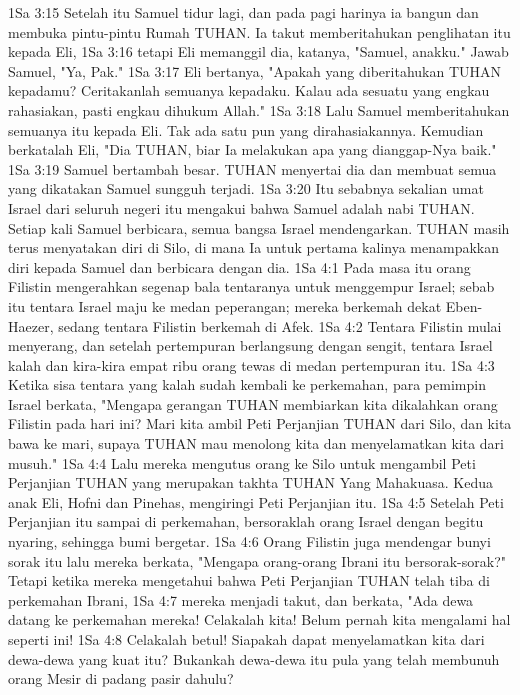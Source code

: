 1Sa 3:15  Setelah itu Samuel tidur lagi, dan pada pagi harinya ia bangun dan membuka pintu-pintu Rumah TUHAN. Ia takut memberitahukan penglihatan itu kepada Eli,
1Sa 3:16  tetapi Eli memanggil dia, katanya, "Samuel, anakku." Jawab Samuel, "Ya, Pak."
1Sa 3:17  Eli bertanya, "Apakah yang diberitahukan TUHAN kepadamu? Ceritakanlah semuanya kepadaku. Kalau ada sesuatu yang engkau rahasiakan, pasti engkau dihukum Allah."
1Sa 3:18  Lalu Samuel memberitahukan semuanya itu kepada Eli. Tak ada satu pun yang dirahasiakannya. Kemudian berkatalah Eli, "Dia TUHAN, biar Ia melakukan apa yang dianggap-Nya baik."
1Sa 3:19  Samuel bertambah besar. TUHAN menyertai dia dan membuat semua yang dikatakan Samuel sungguh terjadi.
1Sa 3:20  Itu sebabnya sekalian umat Israel dari seluruh negeri itu mengakui bahwa Samuel adalah nabi TUHAN. Setiap kali Samuel berbicara, semua bangsa Israel mendengarkan. TUHAN masih terus menyatakan diri di Silo, di mana Ia untuk pertama kalinya menampakkan diri kepada Samuel dan berbicara dengan dia.
1Sa 4:1  Pada masa itu orang Filistin mengerahkan segenap bala tentaranya untuk menggempur Israel; sebab itu tentara Israel maju ke medan peperangan; mereka berkemah dekat Eben-Haezer, sedang tentara Filistin berkemah di Afek.
1Sa 4:2  Tentara Filistin mulai menyerang, dan setelah pertempuran berlangsung dengan sengit, tentara Israel kalah dan kira-kira empat ribu orang tewas di medan pertempuran itu.
1Sa 4:3  Ketika sisa tentara yang kalah sudah kembali ke perkemahan, para pemimpin Israel berkata, "Mengapa gerangan TUHAN membiarkan kita dikalahkan orang Filistin pada hari ini? Mari kita ambil Peti Perjanjian TUHAN dari Silo, dan kita bawa ke mari, supaya TUHAN mau menolong kita dan menyelamatkan kita dari musuh."
1Sa 4:4  Lalu mereka mengutus orang ke Silo untuk mengambil Peti Perjanjian TUHAN yang merupakan takhta TUHAN Yang Mahakuasa. Kedua anak Eli, Hofni dan Pinehas, mengiringi Peti Perjanjian itu.
1Sa 4:5  Setelah Peti Perjanjian itu sampai di perkemahan, bersoraklah orang Israel dengan begitu nyaring, sehingga bumi bergetar.
1Sa 4:6  Orang Filistin juga mendengar bunyi sorak itu lalu mereka berkata, "Mengapa orang-orang Ibrani itu bersorak-sorak?" Tetapi ketika mereka mengetahui bahwa Peti Perjanjian TUHAN telah tiba di perkemahan Ibrani,
1Sa 4:7  mereka menjadi takut, dan berkata, "Ada dewa datang ke perkemahan mereka! Celakalah kita! Belum pernah kita mengalami hal seperti ini!
1Sa 4:8  Celakalah betul! Siapakah dapat menyelamatkan kita dari dewa-dewa yang kuat itu? Bukankah dewa-dewa itu pula yang telah membunuh orang Mesir di padang pasir dahulu?
